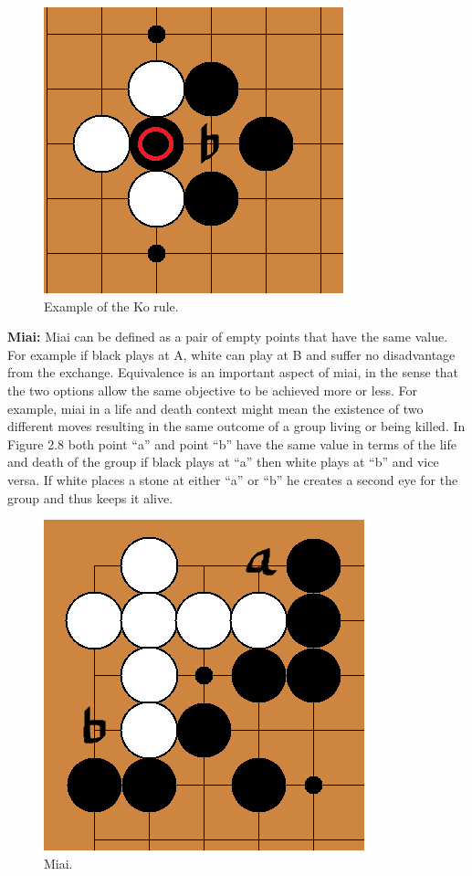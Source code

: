 \documentclass{l3proj}
\begin{document}
\begin{figure}[H]
\centering
\includegraphics[scale=0.5]{Images/korule1.png}
\caption{Example of the Ko rule.}
\end{figure}

\textbf{Miai:} Miai can be defined as a pair of empty points that have the same value. For example if black plays at A, white can play at B and suffer no disadvantage from the exchange. Equivalence is an important aspect of miai, in the sense that the two options allow the same objective to be achieved more or less. For example, miai in a life and death context might mean the existence of two different moves resulting in the same outcome of a group living or being killed. In Figure 2.8 both point “a” and point “b” have the same value in terms of the life and death of the group if black plays at “a” then white plays at “b” and vice versa. If white places a stone at either “a” or “b” he creates a second eye for the group and thus keeps it alive.

\begin{figure}[H]
\centering
\includegraphics[scale=0.5]{Images/miai.png}
\caption{Miai.}
\end{figure}
\end{document}
